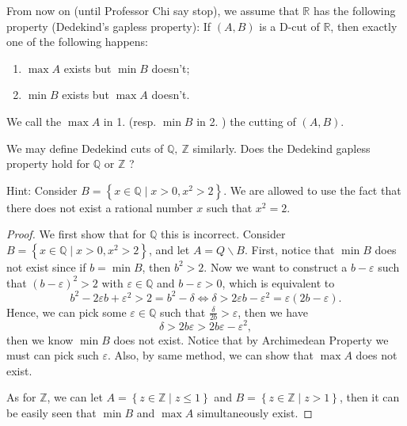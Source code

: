 \begin{theorem}\label{thm: Dedekind's gapless}
	From now on (until Professor Chi say stop), we assume that \(\mathbb{R} \) has the following property (Dedekind's gapless property): If \((A,B)\) is a D-cut of \(\mathbb{R} \), then exactly one of the following happens: 
	\begin{enumerate}
		\item \(\max A\) exists but \(\min B\) doesn't;
		\item \(\min B\) exists but \(\max A\) doesn't.    
	\end{enumerate}  
	We call the \(\max A\) in 1. (resp. \(\min B\) in 2. ) the cutting of \((A,B)\).  
\end{theorem}

\begin{exercise}
	We may define Dedekind cuts of \(\mathbb{Q}, \ \mathbb{Z}  \) similarly. Does the Dedekind gapless property hold for \(\mathbb{Q} \) or \(\mathbb{Z} \) ? 

	Hint: Consider \(B = \left\{ x \in \mathbb{Q} \mid x > 0, x^2 > 2 \right\} \). We are allowed to use the fact that there does not exist a rational number \(x\) such that \(x^2=2\).
\end{exercise}
\begin{proof}
We first show that for \(\mathbb{Q} \) this is incorrect. Consider \(B = \left\{ x \in \mathbb{Q} \mid x>0, x^2 > 2 \right\} \), and let \(A = Q \backslash B\). First, notice that \(\min B\) does not exist since if \(b = \min B\), then \(b^2 > 2\). Now we want to construct a \(b - \varepsilon \) such that \((b - \varepsilon )^2 > 2\) with \(\varepsilon \in \mathbb{Q} \) and \(b - \varepsilon > 0\), which is equivalent to 
\[
	b^2 - 2\varepsilon b + \varepsilon ^2 > 2 = b^2 - \delta \iff \delta >  2\varepsilon b - \varepsilon ^2 = \varepsilon (2b - \varepsilon ).
\]         
Hence, we can pick some \(\varepsilon \in \mathbb{Q} \) such that \(\frac{\delta}{2b} > \varepsilon \), then we have 
\[
	\delta > 2b \varepsilon > 2b \varepsilon - \varepsilon ^2,
\]  then we know \(\min B\) does not exist. Notice that by Archimedean Property we must can pick such \(\varepsilon \). Also, by same method, we can show that \(\max A\) does not exist. 

As for \(\mathbb{Z} \), we can let \(A = \left\{ z \in \mathbb{Z} \mid z \le 1 \right\} \) and \(B = \left\{ z \in \mathbb{Z} \mid z > 1 \right\} \), then it can be easily seen that \(\min B\) and \(\max A\) simultaneously exist.    
\end{proof}   

